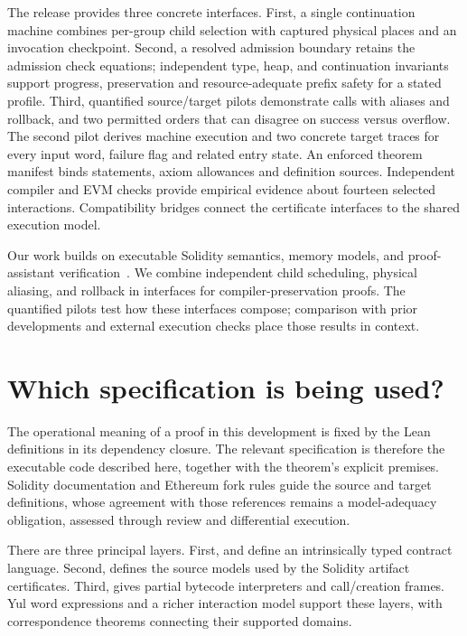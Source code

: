 \documentclass[conference]{IEEEtran}
\begin{document}
The release provides three concrete interfaces. First, a single continuation machine
combines per-group child selection with captured physical places and an
invocation checkpoint. Second, a resolved admission boundary retains the admission
check equations; independent type, heap, and continuation invariants support
progress, preservation and resource-adequate prefix safety for a stated profile.
Third, quantified source/target pilots demonstrate calls with aliases and
rollback, and two permitted orders that can disagree on success versus overflow.
The second pilot derives machine execution and two concrete target traces for
every input word, failure flag and related entry state. An enforced theorem
manifest binds statements, axiom allowances and definition sources. Independent
compiler and EVM checks provide empirical evidence about fourteen selected interactions. Compatibility bridges connect
the certificate interfaces to the shared execution model.

Our work builds on executable Solidity semantics, memory models, and
proof-assistant verification~\cite{ksolidity,lolisa,isabelle,isabelle-shallow,memory-smt,solidcore}.
We combine independent child scheduling, physical aliasing, and rollback in
interfaces for compiler-preservation proofs. The quantified pilots test how
these interfaces compose; comparison with prior developments and external
execution checks place those results in context.

\section{Which specification is being used?}
The operational meaning of a proof in this development is fixed by the Lean
definitions in its dependency closure. The relevant specification is therefore
the executable code described here, together with the theorem's explicit
premises. Solidity documentation and Ethereum fork rules guide the source and
target definitions, whose agreement with those references remains a model-adequacy
obligation, assessed through review and differential execution.

There are three principal layers. First,  and
 define an intrinsically typed contract language.
Second,  defines the source models used by the Solidity
artifact certificates. Third,  gives partial bytecode
interpreters and call/creation frames. Yul word expressions and a richer
interaction model support these layers, with correspondence theorems connecting
their supported domains.
\end{document}
